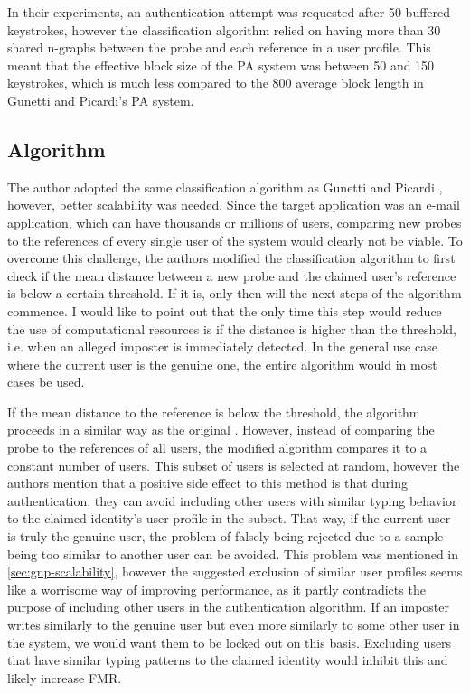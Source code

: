 \documentclass[informationsecurity]{gucmasterproject}
\begin{document}
In their experiments, an authentication attempt was requested after 50 buffered keystrokes, however the classification algorithm relied on having more than 30 shared n-graphs between the probe and each reference in a user profile. This meant that the effective block size of the PA system was between 50 and 150 keystrokes, which is much less compared to the 800 average block length in Gunetti and Picardi's \cite{gnp} PA system.

\subsection{Algorithm}
The author adopted the same classification algorithm as Gunetti and Picardi \cite{gnp}, however, better scalability was needed.
Since the target application was an e-mail application, which can have thousands or millions of users, comparing new probes to the references of every single user of the system would clearly not be viable.
To overcome this challenge, the authors modified the classification algorithm to first check if the mean distance between a new probe and the claimed user's reference is below a certain threshold.
If it is, only then will the next steps of the algorithm commence.
I would like to point out that the only time this step would reduce the use of computational resources is if the distance is higher than the threshold, i.e. when an alleged imposter is immediately detected.
In the general use case where the current user is the genuine one, the entire algorithm would in most cases be used.

If the mean distance to the reference is below the threshold, the algorithm proceeds in a similar way as the original \cite{gnp}.
However, instead of comparing the probe to the references of all users, the modified algorithm compares it to a constant number of users.
This subset of users is selected at random, however the authors mention that a positive side effect to this method is that during authentication, they can avoid including other users with similar typing behavior to the claimed identity's user profile in the subset. 
That way, if the current user is truly the genuine user, the problem of falsely being rejected due to a sample being too similar to another user can be avoided. 
This problem was mentioned in \cref{sec:gnp-scalability}, however the suggested exclusion of similar user profiles seems like a worrisome way of improving performance, as it partly contradicts the purpose of including other users in the authentication algorithm.
If an imposter writes similarly to the genuine user but even more similarly to some other user in the system, we would want them to be locked out on this basis.
Excluding users that have similar typing patterns to the claimed identity would inhibit this and likely increase FMR.
\end{document}
